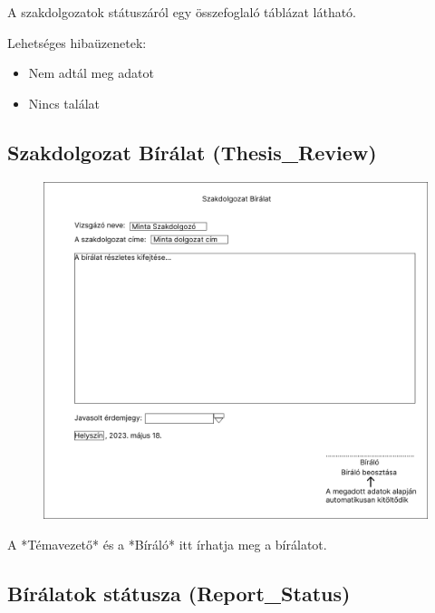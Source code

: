 \documentclass[a4paper,12pt]{article}
\begin{document}
A szakdolgozatok státuszáról egy összefoglaló táblázat látható.

Lehetséges hibaüzenetek:
\begin{itemize}
	\item Nem adtál meg adatot
	\item Nincs találat
\end{itemize}

\subsection{Szakdolgozat Bírálat (Thesis\_Review)}

\begin{figure}
	\centering
	\includegraphics[width=\textwidth]{images/Web_pages/Thesis_Review.jpg}
	\caption{}
	\label{fig:Thesis_Review}
\end{figure}

A *Témavezető* és a *Bíráló* itt írhatja meg a bírálatot.

\subsection{Bírálatok státusza (Report\_Status)}
\end{document}
